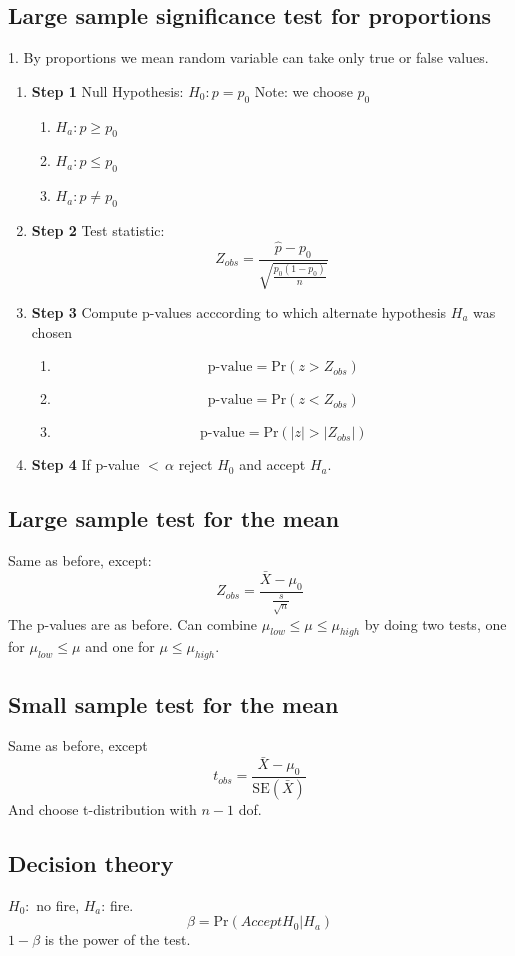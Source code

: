 \documentclass{article}
\newcommand{\beq}{\begin{equation}}
\newcommand{\eeq}{\end{equation}}
\begin{document}
\subsection{Large sample significance test for proportions}
1. By proportions we mean random variable can take only true or false values.
\begin{enumerate}
\item{{\textbf{Step 1}} Null Hypothesis: $H_0: p = p_0$ Note: we choose $p_0$}
  \begin{enumerate}[label=(\alph*)]
  \item{$H_a: p \ge p_0$}
  \item{$H_a: p \le p_0$}
  \item{$H_a: p \ne p_0$}  
  \end{enumerate}
\item{{\textbf{Step 2}} Test statistic:  \beq Z_{obs} = \frac{\hat{p}-p_0}{\sqrt{\frac{p_0(1-p_0)}{n}}} \eeq}
\item{{\textbf{Step 3}} Compute p-values acccording to which alternate hypothesis $H_a$ was chosen}
  \begin{enumerate}[label=(\alph*)]
  \item{\beq\text{p-value}=\text{Pr}(z>Z_{obs})\eeq}
  \item{\beq\text{p-value}=\text{Pr}(z<Z_{obs})\eeq}
  \item{\beq\text{p-value}=\text{Pr}(|z|>|Z_{obs}|)\eeq}
  \end{enumerate}
\item{{\textbf{Step 4}} If p-value $<\,\alpha$ reject $H_0$ and accept $H_a$.}
\end{enumerate}
\subsection{Large sample test for the mean}
Same as before, except:
\beq
Z_{obs} = \frac{\bar{X}-\mu_0}{\frac{s}{\sqrt{n}}}
\eeq
The p-values are as before. Can combine $\mu_{low} \le \mu \le \mu_{high}$ by doing two tests, one for $\mu_{low} \le \mu$ and one for $\mu \le \mu_{high}$.
\subsection{Small sample test for the mean}
Same as before, except
\beq
t_{obs} = \frac{\bar{X}-\mu_0}{\text{SE}(\bar{X})}
\eeq
And choose t-distribution with $n-1$ dof.
\subsection{Decision theory}
$H_0:$ no fire, $H_a$: fire.
\beq
\beta = \text{Pr}(Accept H_0 | H_a)
\eeq
$1-\beta$ is the power of the test.
\end{document}
